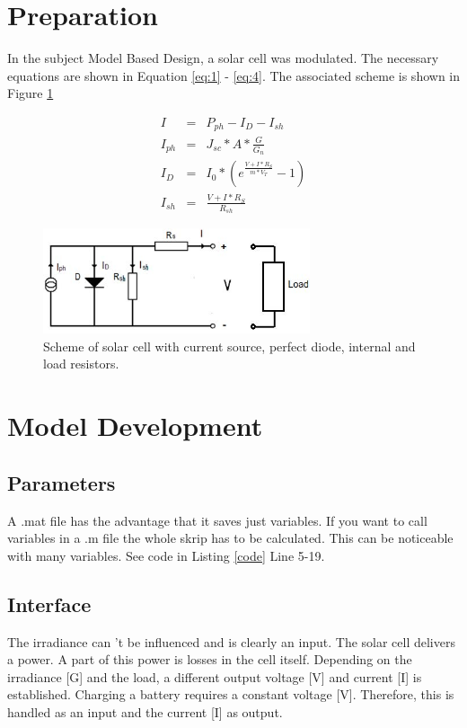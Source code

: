\section*{Preparation}
In the subject Model Based Design, a solar cell was modulated.
The necessary equations are shown in Equation \ref{eq:1} - \ref{eq:4}. The associated scheme is shown in Figure \ref{fig:scheme}

	\begin{eqnarray}
		I &=& P_{ph} - I_D - I_{sh} \label{eq:1}\\
		I_{ph} &=& J_{sc} * A * \frac{G}{G_n} \label{eq:2} \\
		I_D &=& I_0 * \left( e^{\frac{V + I * R_S}{m * V_T}} - 1\right) \label{eq:id} \\
		I_{sh} &=& \frac{V + I * R_S}{R_{sh}} \label{eq:4}
	\end{eqnarray}
	
	\begin{figure}[H]
		\centering
		\includegraphics[width=0.7\textwidth]{figures/scheme.jpg}
		\caption[Scheme of solar cell]{Scheme of solar cell with current source, perfect diode, internal and load resistors.}
		\label{fig:scheme}
	\end{figure}


\section{Model Development}

	\subsection{Parameters}
	A .mat file has the advantage that it saves just variables. If you want to call variables in a .m file the whole skrip has to be calculated. This can be noticeable with many variables. See code in Listing \ref{code} Line 5-19.
	
	\newpage	
	\subsection{Interface}
	The irradiance can 't be influenced and is clearly an input.
	The solar cell delivers a power. A part of this power is losses in the cell itself. Depending on the irradiance [G] and the load, a different output voltage [V] and current [I] is established.
	Charging a battery requires a constant voltage [V]. Therefore, this is handled as an input and the current [I] as output.
	
